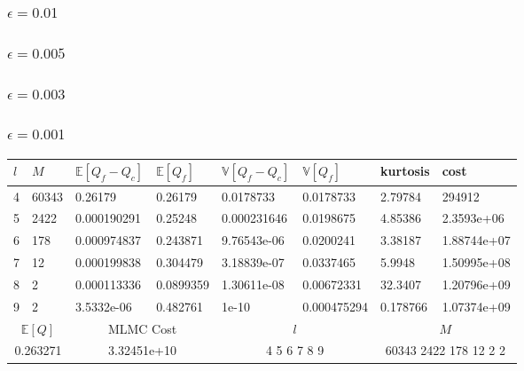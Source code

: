 \subsubsection{$ \epsilon=0.01 $}
\subsubsection{$ \epsilon=0.005 $}
\subsubsection{$ \epsilon=0.003 $}
\subsubsection{$ \epsilon=0.001 $}
\newlength\q
\setlength{}
\noindent\begin{tabular}{|p{0.15\q}|p{0.55\q}|p{1.3\q}|p{1.05\q}|p{1.35\q}|p{1.25\q}|p{\q}|p{1.35\q}|}
\hline
$ l $   &  $ M $  &  $ \mathbb{E}[Q_f-Q_c] $  &   $ \mathbb{E}[Q_f] $ &  $ \mathbb{V}[Q_f-Q_c] $   &   $ \mathbb{V}[Q_f] $ &  kurtosis    &    cost\\
\hline
4 & 60343 &    0.26179  &  0.26179  & 0.0178733   &  0.0178733   &  2.79784 &  294912    \\
5 & 2422  & 0.000190291 &   0.25248 & 0.000231646 &  0.0198675   &  4.85386 & 2.3593e+06 \\
6 & 178   & 0.000974837 & 0.243871  & 9.76543e-06 &  0.0200241   &  3.38187 & 1.88744e+07\\
7 & 12    & 0.000199838 & 0.304479  & 3.18839e-07 &  0.0337465   &   5.9948 & 1.50995e+08\\
8 & 2     & 0.000113336 & 0.0899359 & 1.30611e-08 & 0.00672331   &  32.3407 & 1.20796e+09\\
9 & 2     & 3.5332e-06  & 0.482761  &   1e-10     & 0.000475294  & 0.178766 & 1.07374e+09\\
\hline
\hline
 \multicolumn{2}{|c|}{$ \mathbb{E}[Q] $ }  &  \multicolumn{2}{c|}{MLMC Cost}   & \multicolumn{2}{c|}{$ l $}  &    \multicolumn{2}{c|}{$ M$} \\
\hline
 \multicolumn{2}{|c|}{0.263271} & \multicolumn{2}{c|}{3.32451e+10 } &  \multicolumn{2}{c|}{ 4 5 6 7 8 9  }     & \multicolumn{2}{c|}{60343 2422 178 12 2 2}    \\
\hline 
\hline
\end{tabular}\\
